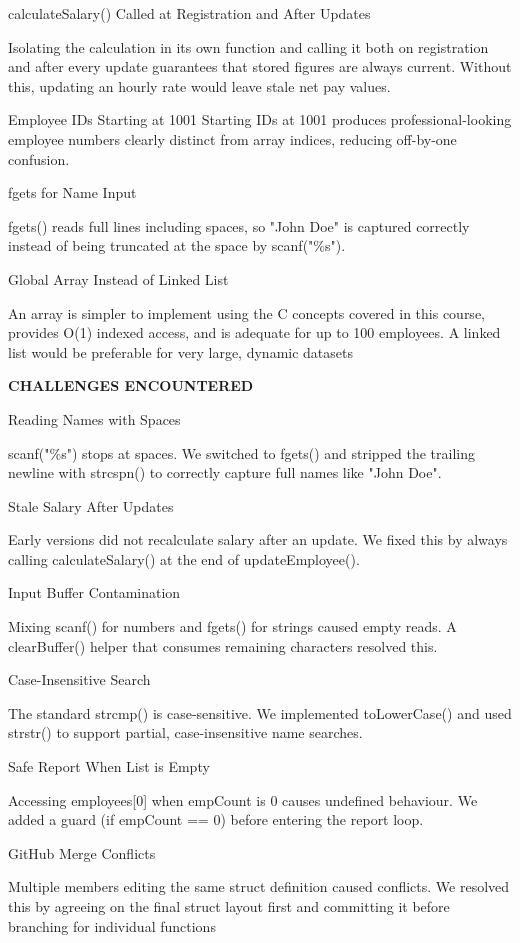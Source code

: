 \documentclass[
]{article}
\begin{document}
calculateSalary() Called at Registration and After Updates

Isolating the calculation in its own function and calling it both on
registration and after every update guarantees that stored figures are
always current. Without this, updating an hourly rate would leave stale
net pay values.

Employee IDs Starting at 1001 Starting IDs at 1001 produces
professional-looking employee numbers clearly distinct from array
indices, reducing off-by-one confusion.

fgets for Name Input

fgets() reads full lines including spaces, so "John Doe" is captured
correctly instead of being truncated at the space by scanf("\%s").

Global Array Instead of Linked List

An array is simpler to implement using the C concepts covered in this
course, provides O(1) indexed access, and is adequate for up to 100
employees. A linked list would be preferable for very large, dynamic
datasets

\textbf{CHALLENGES ENCOUNTERED}

Reading Names with Spaces

scanf("\%s") stops at spaces. We switched to fgets() and stripped the
trailing newline with strcspn() to correctly capture full names like
"John Doe".

Stale Salary After Updates

Early versions did not recalculate salary after an update. We fixed this
by always calling calculateSalary() at the end of updateEmployee().

Input Buffer Contamination

Mixing scanf() for numbers and fgets() for strings caused empty reads. A
clearBuffer() helper that consumes remaining characters resolved this.

Case-Insensitive Search

The standard strcmp() is case-sensitive. We implemented toLowerCase()
and used strstr() to support partial, case-insensitive name searches.

Safe Report When List is Empty

Accessing employees{[}0{]} when empCount is 0 causes undefined
behaviour. We added a guard (if empCount == 0) before entering the
report loop.

GitHub Merge Conflicts

Multiple members editing the same struct definition caused conflicts. We
resolved this by agreeing on the final struct layout first and
committing it before branching for individual functions
\end{document}
